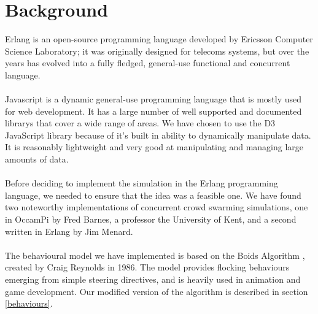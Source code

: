 \documentclass[10pt, a4paper, conference, compsocconf]{IEEEtran}
\begin{document}
\section{Background \label{background}}
Erlang is an open-source programming language developed by Ericsson Computer Science Laboratory; it was originally designed for telecoms systems, but over the years has evolved into a fully fledged, general-use functional and concurrent language.\\
\\
Javascript is a dynamic general-use programming language that is mostly used for web development. It has a large number of well supported and documented librarys that cover a wide range of areas. We have chosen to use the D3\cite{d3} JavaScript library because of it's built in ability to dynamically manipulate data. It is reasonably lightweight and very good at manipulating and managing large amounts of data.\\
\\%
Before deciding to implement the simulation in the Erlang programming language, we needed to ensure that the idea was a feasible one. We have found two noteworthy implementations of concurrent crowd swarming simulations, one in OccamPi by Fred Barnes\cite{occam_boids}, a professor the University of Kent, and a second written in Erlang by Jim Menard\cite{erlang_boids}.\\
\\%
The behavioural model we have implemented is based on the Boids Algorithm \cite{boids}, created by Craig Reynolds in 1986. The model provides flocking behaviours emerging from simple steering directives, and is heavily used in animation and game development. Our modified version of the algorithm is described in section \ref{behaviours}.\\
\end{document}

